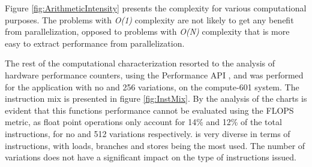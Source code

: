 Figure \ref{fig:ArithmeticIntensity} presents the complexity for various computational purposes. The problems with \textit{O(1)} complexity are not likely to get any benefit from parallelization, opposed to problems with \textit{O(N)} complexity that is more easy to extract performance from parallelization.

The rest of the computational characterization resorted to the analysis of hardware performance counters, using the Performance API \cite{PAPI}, and was performed for the application with no and 256 variations, on the compute-601 system. The instruction mix is presented in figure \ref{fig:InstMix}. By the analysis of the charts is evident that this functions performance cannot be evaluated using the FLOPS metric, as float point operations only account for 14\% and 12\% of the total instructions, for no and 512 variations respectively. \ttDilepKinFit is very diverse in terms of instructions, with loads, branches and stores being the most used. The number of variations does not have a significant impact on the type of instructions issued.

